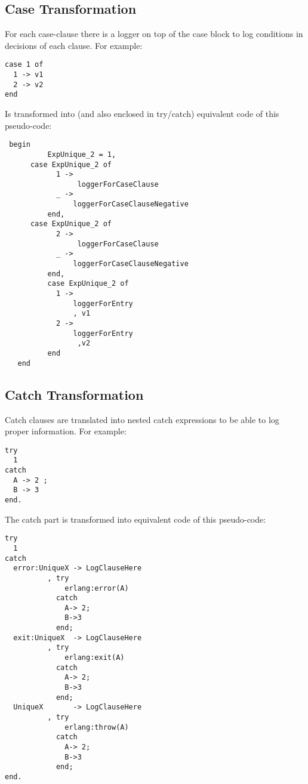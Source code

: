 \documentclass[12pt,a4paper]{report}
\begin{document}
\subsection{Case Transformation}
For each case-clause there is a logger on top of the case block to log conditions in decisions of each clause.
For example:

\begin{lstlisting}
case 1 of 
  1 -> v1
  2 -> v2
end 
\end{lstlisting}

Is transformed into (and also enclosed in try/catch) equivalent code of this pseudo-code:
\begin{lstlisting}
 begin
          ExpUnique_2 = 1,
	  case ExpUnique_2 of
            1 ->
                 loggerForCaseClause
            _ ->
                loggerForCaseClauseNegative
          end,
	  case ExpUnique_2 of
            2 ->
                 loggerForCaseClause
            _ ->
                loggerForCaseClauseNegative
          end,
          case ExpUnique_2 of
            1 ->
                loggerForEntry
                , v1
            2 ->
                loggerForEntry
                 ,v2  
          end
   end
\end{lstlisting}  

\subsection{Catch Transformation}
Catch clauses are translated into nested catch expressions to be able to log proper information. For example:

\begin{lstlisting}
try 
  1 
catch 
  A -> 2 ;
  B -> 3
end.
\end{lstlisting}

The catch part is transformed into equivalent code of this pseudo-code:
\begin{lstlisting}
try 
  1 
catch
  error:UniqueX -> LogClauseHere
		  , try 
		      erlang:error(A) 
		    catch 
		      A-> 2;
		      B->3 
		    end;
  exit:UniqueX  -> LogClauseHere
		  , try
		      erlang:exit(A) 
		    catch 
		      A-> 2;
		      B->3 
		    end;
  UniqueX       -> LogClauseHere
		  , try 
		      erlang:throw(A) 
		    catch
		      A-> 2;
		      B->3
		    end;
end.
\end{lstlisting}
\end{document}
